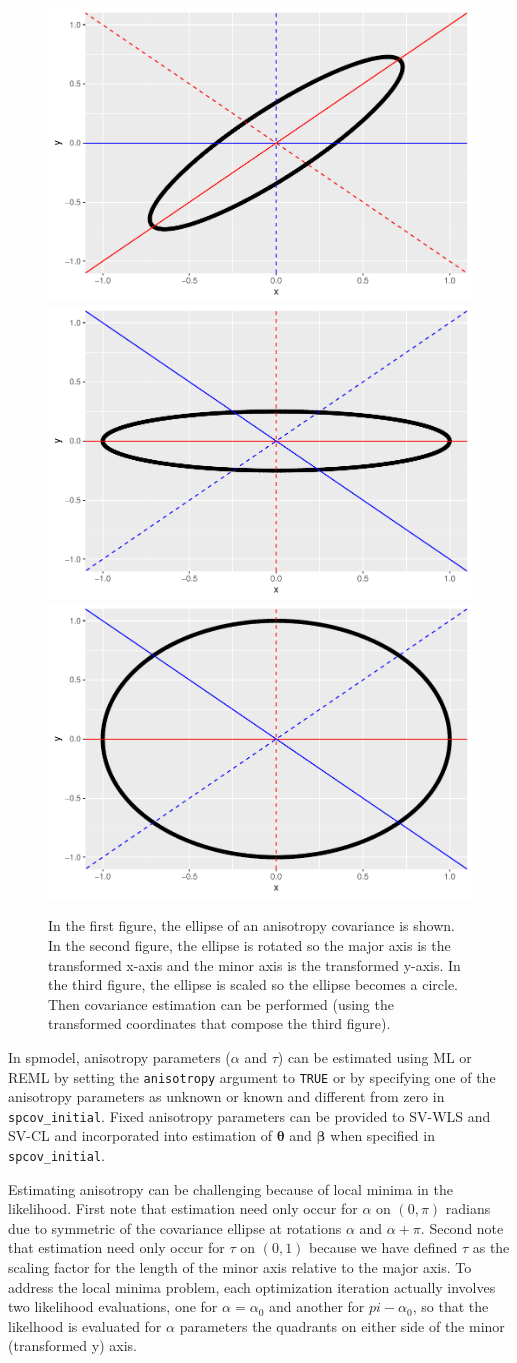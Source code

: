 \documentclass{article}
\begin{document}
\begin{figure}
\includegraphics[width=0.33\linewidth]{supplementary_files/figure-latex/anisotropy-1} \includegraphics[width=0.33\linewidth]{supplementary_files/figure-latex/anisotropy-2} \includegraphics[width=0.33\linewidth]{supplementary_files/figure-latex/anisotropy-3} \caption{In the first figure, the ellipse of an anisotropy covariance is shown. In the second figure, the ellipse is rotated so the major axis is the transformed x-axis and the minor axis is the transformed y-axis. In the third figure, the ellipse is scaled so the ellipse becomes a circle. Then covariance estimation can be performed (using the transformed coordinates that compose the third figure).}\label{fig:anisotropy}
\end{figure}

In spmodel, anisotropy parameters (\(\alpha\) and \(\tau\)) can be
estimated using ML or REML by setting the \texttt{anisotropy} argument
to \texttt{TRUE} or by specifying one of the anisotropy parameters as
unknown or known and different from zero in \texttt{spcov\_initial}.
Fixed anisotropy parameters can be provided to SV-WLS and SV-CL and
incorporated into estimation of \(\bm{\theta}\) and \(\bm{\beta}\) when
specified in \texttt{spcov\_initial}.

Estimating anisotropy can be challenging because of local minima in the
likelihood. First note that estimation need only occur for \(\alpha\) on
\((0, \pi)\) radians due to symmetric of the covariance ellipse at
rotations \(\alpha\) and \(\alpha + \pi\). Second note that estimation
need only occur for \(\tau\) on \((0, 1)\) because we have defined
\(\tau\) as the scaling factor for the length of the minor axis relative
to the major axis. To address the local minima problem, each
optimization iteration actually involves two likelihood evaluations, one
for \(\alpha = \alpha_0\) and another for \(pi - \alpha_0\), so that the
likelhood is evaluated for \(\alpha\) parameters the quadrants on either
side of the minor (transformed y) axis.
\end{document}
